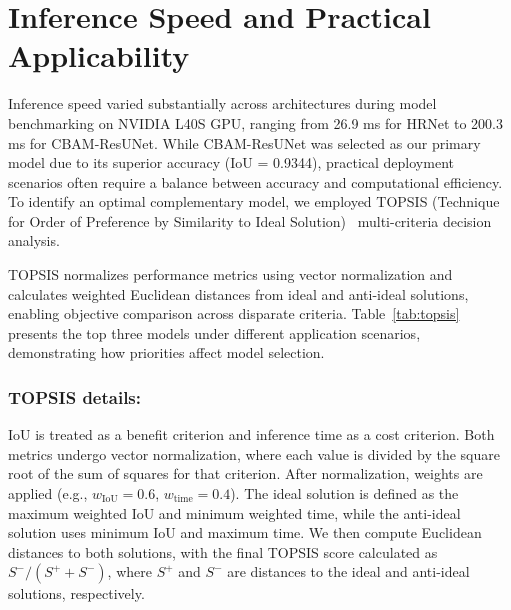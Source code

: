 \documentclass[preprint,12pt]{elsarticle}
\begin{document}
\appendix
\section{Inference Speed and Practical Applicability}

Inference speed varied substantially across architectures during model benchmarking on NVIDIA L40S GPU, ranging from 26.9 ms for HRNet to 200.3 ms for CBAM-ResUNet. While CBAM-ResUNet was selected as our primary model due to its superior accuracy (IoU = 0.9344), practical deployment scenarios often require a balance between accuracy and computational efficiency. To identify an optimal complementary model, we employed TOPSIS (Technique for Order of Preference by Similarity to Ideal Solution)~\cite{HwangYoon1981} multi-criteria decision analysis.

TOPSIS normalizes performance metrics using vector normalization and calculates weighted Euclidean distances from ideal and anti-ideal solutions, enabling objective comparison across disparate criteria. Table~\ref{tab:topsis} presents the top three models under different application scenarios, demonstrating how priorities affect model selection.

\subsubsection{TOPSIS details:}
IoU is treated as a benefit criterion and inference time as a cost criterion. Both metrics undergo vector normalization, where each value is divided by the square root of the sum of squares for that criterion. After normalization, weights are applied (e.g., $w_{\text{IoU}}=0.6$, $w_{\text{time}}=0.4$). The ideal solution is defined as the maximum weighted IoU and minimum weighted time, while the anti-ideal solution uses minimum IoU and maximum time. We then compute Euclidean distances to both solutions, with the final TOPSIS score calculated as $S^- / (S^+ + S^-)$, where $S^+$ and $S^-$ are distances to the ideal and anti-ideal solutions, respectively.
\end{document}
